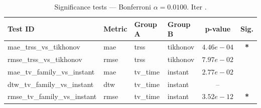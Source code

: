 ﻿%
\begin{table}[ht]
\centering
\caption[EEG reconstruction - Iteration it27]{Significance tests — Bonferroni $\alpha=0.0100$. Iter .}
\label{tab:sig_it27_synthetic_alpha_all_graphs}
\small
\begin{tabular}{llllcc}
\toprule
Test ID & Metric & Group A & Group B & p-value & Sig. \\
\midrule
mae\_trss\_vs\_tikhonov & mae & trss & tikhonov & $4.46e-04$ & \textbf{*} \\
rmse\_trss\_vs\_tikhonov & rmse & trss & tikhonov & $7.97e-02$ &  \\
mae\_tv\_family\_vs\_instant & mae & tv\_time & instant & $2.77e-02$ &  \\
dtw\_tv\_family\_vs\_instant & dtw & tv\_time & instant & -- &  \\
rmse\_tv\_family\_vs\_instant & rmse & tv\_time & instant & $3.52e-12$ & \textbf{*} \\
\bottomrule
\end{tabular}
\end{table}







